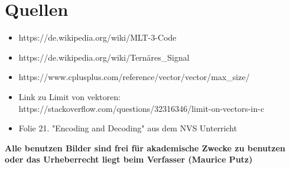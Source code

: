 \documentclass{article}
\begin{document}
\section{Quellen}

\begin{itemize}
	\item https://de.wikipedia.org/wiki/MLT-3-Code
	\item https://de.wikipedia.org/wiki/Ternäres\_Signal
	\item https://www.cplusplus.com/reference/vector/vector/max\_size/
	\item Link zu Limit von vektoren: https://stackoverflow.com/questions/32316346/limit-on-vectors-in-c
	\item Folie 21. "Encoding and Decoding" aus dem NVS Unterricht
\end{itemize}

\textbf{Alle benutzen Bilder sind frei für akademische Zwecke zu benutzen oder das Urheberrecht liegt beim Verfasser (Maurice Putz)}
\end{document}
